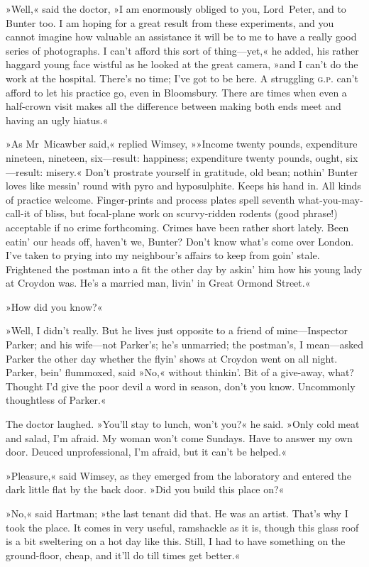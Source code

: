»Well,« said the doctor, »I am enormously obliged to you, Lord~Peter, and to Bunter too. I am hoping for a great result from these experiments, and you cannot imagine how valuable an assistance it will be to me to have a really good series of photographs. I can't afford this sort of thing—yet,« he added, his rather haggard young face wistful as he looked at the great camera, »and I can't do the work at the hospital. There's no time; I've got to be here. A struggling \textsc{g.p.} can't afford to let his practice go, even in Bloomsbury. There are times when even a half-crown visit makes all the difference between making both ends meet and having an ugly hiatus.«

»As Mr~Micawber said,« replied Wimsey, »»Income twenty pounds, expenditure nineteen, nineteen, six—result: happiness; expenditure twenty pounds, ought, six—result: misery.« Don't prostrate yourself in gratitude, old bean; nothin' Bunter loves like messin' round with pyro and hyposulphite. Keeps his hand in. All kinds of practice welcome. Finger-prints and process plates spell seventh what-you-may-call-it of bliss, but focal-plane work on scurvy-ridden rodents (good phrase!) acceptable if no crime forthcoming. Crimes have been rather short lately. Been eatin' our heads off, haven't we, Bunter? Don't know what's come over London. I've taken to prying into my neighbour's affairs to keep from goin' stale. Frightened the postman into a fit the other day by askin' him how his young lady at Croydon was. He's a married man, livin' in Great Ormond Street.«

»How did you know?«

»Well, I didn't really. But he lives just opposite to a friend of mine—Inspector Parker; and his wife—not Parker's; he's unmarried; the postman's, I mean—asked Parker the other day whether the flyin' shows at Croydon went on all night. Parker, bein' flummoxed, said »No,« without thinkin'. Bit of a give-away, what? Thought I'd give the poor devil a word in season, don't you know. Uncommonly thoughtless of Parker.«

The doctor laughed. »You'll stay to lunch, won't you?« he said. »Only cold meat and salad, I'm afraid. My woman won't come Sundays. Have to answer my own door. Deuced unprofessional, I'm afraid, but it can't be helped.«

»Pleasure,« said Wimsey, as they emerged from the laboratory and entered the dark little flat by the back door. »Did you build this place on?«

»No,« said Hartman; »the last tenant did that. He was an artist. That's why I took the place. It comes in very useful, ramshackle as it is, though this glass roof is a bit sweltering on a hot day like this. Still, I had to have something on the ground-floor, cheap, and it'll do till times get better.«

